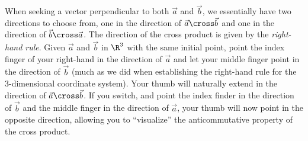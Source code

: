 \documentclass{ximera}
\begin{document}
When seeking a vector perpendicular to both $\vec a$ and $\vec b$, we
essentially have two directions to choose from, one in the direction
of $\vec{a}\cross\vec{b}$ and one in the direction of
$\vec{b}\cross\vec{a}$.  The direction of the cross product is given
by the \textit{right-hand rule}.  Given $\vec{a}$ and $\vec{b}$ in
$\R^3$ with the same initial point, point the index finger of your
right-hand in the direction of $\vec{a}$ and let your middle finger
point in the direction of $\vec{b}$ (much as we did when establishing
the right-hand rule for the 3-dimensional coordinate system). Your
thumb will naturally extend in the direction of
$\vec{a}\cross\vec{b}$.  If you switch, and point the index finder in
the direction of $\vec{b}$ and the middle finger in the direction of
$\vec{a}$, your thumb will now point in the opposite direction,
allowing you to ``visualize'' the anticommutative property of the
cross product.
\end{document}
